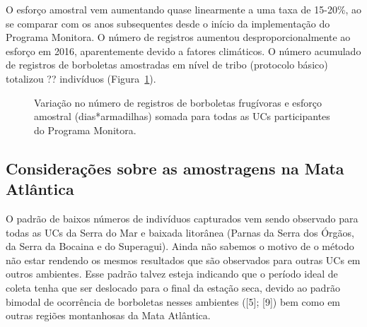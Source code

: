 \documentclass[
  letterpaper,
]{scrbook}
\begin{document}
O esforço amostral vem aumentando quase linearmente a uma taxa de
15-20\%, ao se comparar com os anos subsequentes desde o início da
implementação do Programa Monitora. O número de registros aumentou
desproporcionalmente ao esforço em 2016, aparentemente devido a fatores
climáticos. O número acumulado de registros de borboletas amostradas em
nível de tribo (protocolo básico) totalizou ?? indivíduos
(Figura~\ref{fig-esforco-amostral}).

\begin{figure}[H]


\caption{\label{fig-esforco-amostral}Variação no número de registros de
borboletas frugívoras e esforço amostral (dias*armadilhas) somada para
todas as UCs participantes do Programa Monitora.}

\end{figure}%

\subsection{Considerações sobre as amostragens na Mata
Atlântica}\label{considerauxe7uxf5es-sobre-as-amostragens-na-mata-atluxe2ntica}

O padrão de baixos números de indivíduos capturados vem sendo observado
para todas as UCs da Serra do Mar e baixada litorânea (Parnas da Serra
dos Órgãos, da Serra da Bocaina e do Superagui). Ainda não sabemos o
motivo de o método não estar rendendo os mesmos resultados que são
observados para outras UCs em outros ambientes. Esse padrão talvez
esteja indicando que o período ideal de coleta tenha que ser deslocado
para o final da estação seca, devido ao padrão bimodal de ocorrência de
borboletas nesses ambientes ({[}5{]}; {[}9{]}) bem como em outras
regiões montanhosas da Mata Atlântica.
\end{document}
